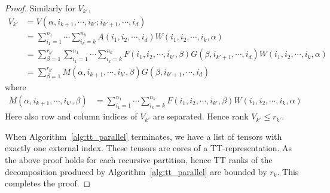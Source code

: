 \documentclass[runningheads]{llncs}
\begin{document}
\begin{proof}
	\medskip
	\noindent Similarly for $V_{k'}$,
	\begin{align*}
	V_{k'}&= V(\alpha, i_{k+1}, \cdots, i_{k'}; i_{k'+1},\cdots, i_d)\\
	&= \sum_{i_1=1}^{n_1} \cdots \sum_{i_k=k}^{n_k} A(i_1, i_2, \cdots, i_d) W(i_1,i_2,\cdots, i_k, \alpha)\\
	&= \sum_{\beta=1}^{r_{k'}} \sum_{i_1=1}^{n_1} \cdots \sum_{i_k=k}^{n_k} F(i_1,i_2,\cdots ,i_{k'}, \beta) G(\beta, i_{k'+1},\cdots, i_d) W(i_1,i_2,\cdots, i_k, \alpha)\\ 
	&= \sum_{\beta=1}^{r_{k'}} M(\alpha, i_{k+1}, \cdots, i_{k'}, \beta) G(\beta, i_{k'+1},\cdots, i_d)
	\end{align*}	
	\noindent where
	\begin{align*}
	M(\alpha, i_{k+1}, \cdots, i_{k'}, \beta) &= \sum_{i_1=1}^{n_1} \cdots \sum_{i_k=k}^{n_k} F(i_1,i_2,\cdots ,i_{k'}, \beta) W(i_1,i_2,\cdots, i_k, \alpha)
	\end{align*}
	\noindent Here also row and column indices of $V_{k'}$ are separated. Hence rank $V_{k'} \le r_{k'}$.
	
	When Algorithm~\ref{alg:tt_parallel} terminates, we have a list of tensors with exactly one external index. These tensors are cores of a TT-representation. As the above proof holds for each recursive partition, hence TT ranks of the decomposition produced by Algorithm~\ref{alg:tt_parallel} are bounded by $r_k$. This completes the proof.
\end{proof}
\end{document}
